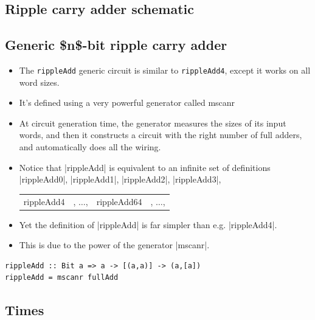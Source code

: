 \documentclass[]{svmono}
\begin{document}
\subsection*{Ripple carry adder schematic}
\label{sec:orga4e356e}
\subsection*{Generic \$n\$-bit ripple carry adder}
\label{sec:orgd2c931a}

\begin{itemize}
\item The \texttt{rippleAdd} generic circuit is similar to
\texttt{rippleAdd4}, except it works on all word sizes.

\item It's defined using a very powerful generator called mscanr

\item At circuit generation time, the generator measures the sizes of
its input words, and then it constructs a circuit with the right
number of full adders, and automatically does all the wiring.

\item Notice that |rippleAdd| is equivalent to an infinite set of
definitions |rippleAdd0|, |rippleAdd1|, |rippleAdd2|, |rippleAdd3|,
\begin{center}
\begin{tabular}{llll}
rippleAdd4 & , \(\ldots\), & rippleAdd64 & , \(\ldots\),\\
\end{tabular}
\end{center}

\item Yet the definition of |rippleAdd| is far simpler than
e.g. |rippleAdd4|.

\item This is due to the power of the generator |mscanr|.
\end{itemize}

\begin{verbatim}
rippleAdd :: Bit a => a -> [(a,a)] -> (a,[a])
rippleAdd = mscanr fullAdd
\end{verbatim}
\subsection*{Times}
\label{sec:orgfba12f0}
\end{document}
